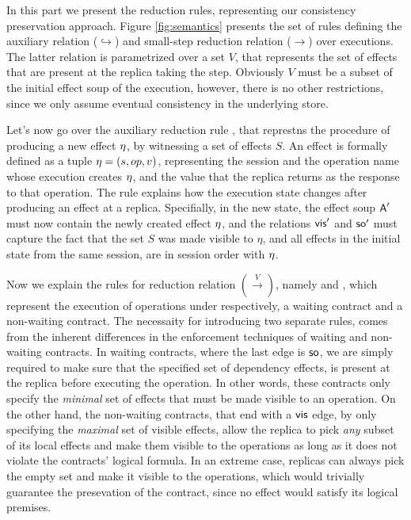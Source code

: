 In this part we present the reduction rules, representing our
consistency preservation approach.
Figure \ref{fig:semantics} presents the set of rules defining the
auxiliary relation ($\hookrightarrow$) and small-step reduction relation 
($\rightarrow$) over executions. The latter relation is parametrized
over a set $V$,
that represents the set of effects that are present at the replica
taking the step. Obviously $V$ must be a subset of the initial effect soup 
of the execution, however, there is no other restrictions,
since we only assume eventual consistency in the underlying store.

Let's now go over the auxiliary reduction rule
,
that represtns the procedure of producing a new effect $\eta$, by witnessing a set
of effects $S$. 
An effect is formally defined as a tuple $\eta=(s,op,v)$, representing the
session and the operation name 
whose execution creates $\eta$, and the value
that the replica returns as the response to that operation.
The rule explains how the execution state changes after producing an
effect at a replica. Specifially, in the new state, the effect soup
${\normalfont \textsf{A}}'$ must
now contain the newly created effect $\eta$, and the relations ${\normalfont \textsf{vis}}'$
and ${\normalfont \textsf{so}}'$ must capture the fact that the set $S$ was made
visible to $\eta$, and all effects in the initial state from the same
session, are in session order with $\eta$.

Now we explain the rules for reduction relation $(\xrightarrow{V})$,
namely   and
, which represent the execution of operations
under  respectively, a waiting contract and a non-waiting contract. 
The necessaity for introducing two separate  rules, comes from the
inherent differences in the enforcement techniques of
waiting and non-waiting contracts. In waiting contracts, where the last
edge is ${\normalfont \textsf{so}}$, we are simply required to make sure that the
specified set of dependency effects, is
present at the replica before executing the operation.
In other words, these contracts only specify
the \emph{minimal} set of effects that must be made visible to an
operation. On the other hand, the non-waiting contracts, that end with a
${\normalfont \textsf{vis}}$ edge, by only specifying the \emph{maximal} set of visible
effects, allow the replica to pick \emph{any} subset of its local
effects and make them visible to the operations as long as it does not
violate the contracts' logical formula. In an extreme case, replicas can
always pick the empty set and make it visible to the operations, which
would trivially guarantee the presevation of the contract, since no effect
would satisfy its logical premises.

